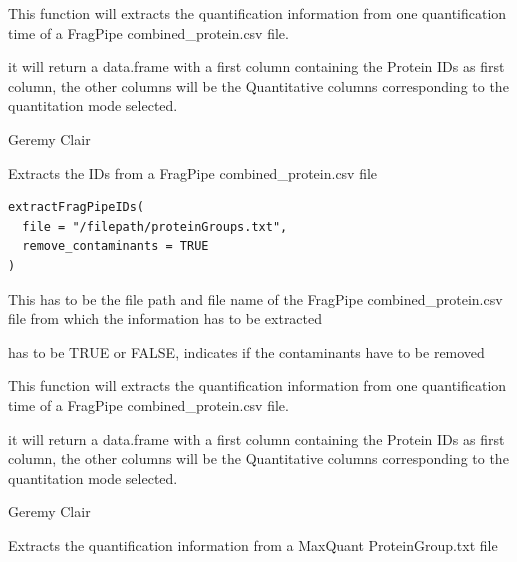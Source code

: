 \documentclass[a4paper]{book}
\begin{document}
%
\begin{Details}
This function will extracts the quantification information from one quantification time of a FragPipe combined\_protein.csv file.
\end{Details}
%
\begin{Value}
it will return a data.frame with a first column containing the Protein IDs as first column, the other columns will be the Quantitative columns corresponding to the quantitation mode selected.
\end{Value}
%
\begin{Author}
Geremy Clair
\end{Author}
%
\begin{Description}
Extracts the IDs from a FragPipe combined\_protein.csv file
\end{Description}
%
\begin{Usage}
\begin{verbatim}
extractFragPipeIDs(
  file = "/filepath/proteinGroups.txt",
  remove_contaminants = TRUE
)
\end{verbatim}
\end{Usage}
%
\begin{Arguments}
\begin{ldescription}
\item[\code{file}] This has to be the file path and file name of the FragPipe combined\_protein.csv file from which the information has to be extracted

\item[\code{remove\_contaminants}] has to be TRUE or FALSE, indicates if the contaminants have to be removed
\end{ldescription}
\end{Arguments}
%
\begin{Details}
This function will extracts the quantification information from one quantification time of a FragPipe combined\_protein.csv file.
\end{Details}
%
\begin{Value}
it will return a data.frame with a first column containing the Protein IDs as first column, the other columns will be the Quantitative columns corresponding to the quantitation mode selected.
\end{Value}
%
\begin{Author}
Geremy Clair
\end{Author}
%
\begin{Description}
Extracts the quantification information from a MaxQuant ProteinGroup.txt file
\end{Description}
\end{document}
